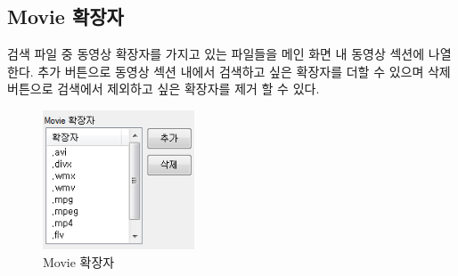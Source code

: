 \documentclass[letterpaper, 11pt]{article} %
\begin{document}
	\subsection{Movie 확장자}
	검색 파일 중 동영상 확장자를 가지고 있는 파일들을 메인 화면 내 동영상 섹션에 나열한다. 추가 버튼으로 동영상 섹션 내에서 검색하고 싶은 확장자를 더할 수 있으며 삭제 버튼으로 검색에서 제외하고 싶은 확장자를 제거 할 수 있다.
	
	\begin{figure}[h]
		\centering
		\includegraphics[width=0.4\textwidth]{Figures/Movie}
		\caption{Movie 확장자}
		\label{fig:movie}
	\end{figure}
	
\end{document}
